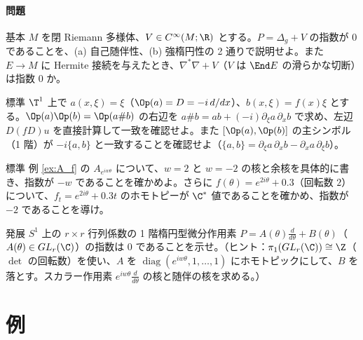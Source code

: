 \paragraph{問題}
\begin{prob}{基本}\label{p:stronglyell}
$M$ を閉 Riemann 多様体、$V\in C^\infty(M;\R)$ とする。$P=\Delta_g+V$ の指数が $0$ であることを、(a) 自己随伴性、(b) 強楕円性の 2 通りで説明せよ。また $E\to M$ に Hermite 接続を与えたとき、$\nabla^*\nabla+V$（$V$ は $\End E$ の滑らかな切断）は指数 $0$ か。
\end{prob}
\begin{prob}{標準}\label{p:composition}
$\T^1$ 上で $a(x,\xi)=\xi$（$\Op(a)=D=-i\,d/dx$）、$b(x,\xi)=f(x)\xi$ とする。$\Op(a)\Op(b)=\Op(a\#b)$ の右辺を $a\#b=ab+(-i)\partial_\xi a\,\partial_xb$ で求め、左辺 $D(fD)u$ を直接計算して一致を確認せよ。また $[\Op(a),\Op(b)]$ の主シンボル（1 階）が $-i\{a,b\}$ と一致することを確認せよ（$\{a,b\}=\partial_\xi a\,\partial_xb-\partial_xa\,\partial_\xi b$）。
\end{prob}
\begin{prob}{標準}\label{p:Af}
例 \ref{ex:A_f} の $A_{e^{iw\theta}}$ について、$w=2$ と $w=-2$ の核と余核を具体的に書き、指数が $-w$ であることを確かめよ。さらに $f(\theta)=e^{2i\theta}+0.3$（回転数 $2$）について、$f_t=e^{2i\theta}+0.3t$ のホモトピーが $\C^*$ 値であることを確かめ、指数が $-2$ であることを導け。
\end{prob}
\begin{prob}{発展}\label{p:S1odd}
$S^1$ 上の $r\times r$ 行列係数の 1 階楕円型微分作用素 $P=A(\theta)\frac d{d\theta}+B(\theta)$（$A(\theta)\in GL_r(\C)$）の指数は $0$ であることを示せ。（ヒント：$\pi_1(GL_r(\C))\cong\Z$（$\det$ の回転数）を使い、$A$ を $\operatorname{diag}(e^{iw\theta},1,\dots,1)$ にホモトピックにして、$B$ を落とす。スカラー作用素 $e^{iw\theta}\frac d{d\theta}$ の核と随伴の核を求める。）
\end{prob}

\section{例}\label{sec:examples}
